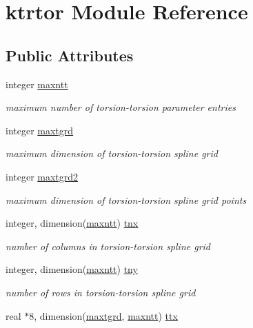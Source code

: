 \hypertarget{classktrtor}{\section{ktrtor Module Reference}
\label{classktrtor}
}
\subsection*{Public Attributes}
\begin{DoxyCompactItemize}
\item 
integer \hyperlink{classktrtor_a3ec5934a4d1ffdfbc4f1bfbc33b1b836}{maxntt}
\begin{DoxyCompactList}\small\item\em maximum number of torsion-\/torsion parameter entries \end{DoxyCompactList}\item 
integer \hyperlink{classktrtor_a5c2d655cdc848a5d23532dc079e23cc5}{maxtgrd}
\begin{DoxyCompactList}\small\item\em maximum dimension of torsion-\/torsion spline grid \end{DoxyCompactList}\item 
integer \hyperlink{classktrtor_a83f65d5a672e0c8e0cf9db285915243b}{maxtgrd2}
\begin{DoxyCompactList}\small\item\em maximum dimension of torsion-\/torsion spline grid points \end{DoxyCompactList}\item 
integer, dimension(\hyperlink{classktrtor_a3ec5934a4d1ffdfbc4f1bfbc33b1b836}{maxntt}) \hyperlink{classktrtor_a33f01d9cd25678eee34804747d565ea0}{tnx}
\begin{DoxyCompactList}\small\item\em number of columns in torsion-\/torsion spline grid \end{DoxyCompactList}\item 
integer, dimension(\hyperlink{classktrtor_a3ec5934a4d1ffdfbc4f1bfbc33b1b836}{maxntt}) \hyperlink{classktrtor_a56e9a9a959e5d5dddf9ba1ab5291238b}{tny}
\begin{DoxyCompactList}\small\item\em number of rows in torsion-\/torsion spline grid \end{DoxyCompactList}\item 
real $\ast$8, dimension(\hyperlink{classktrtor_a5c2d655cdc848a5d23532dc079e23cc5}{maxtgrd}, \hyperlink{classktrtor_a3ec5934a4d1ffdfbc4f1bfbc33b1b836}{maxntt}) \hyperlink{classktrtor_ad5663a5bb938d0665ee40737ac9e49b8}{ttx}

\end{DoxyCompactItemize}
